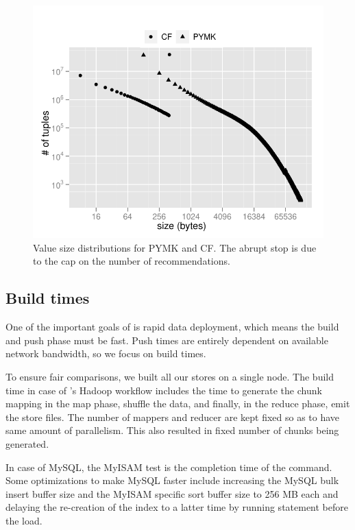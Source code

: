 \begin{figure}
  \centering
    \includegraphics[scale=0.55]{images/data_distribution.pdf}
  \caption{Value size distributions for PYMK and CF. The abrupt stop
is due to the cap on the number of recommendations.}
  \label{distribution}
\end{figure}

\subsection{Build times}

One of the important goals of \projectname{} is rapid data deployment,
which means the build and push phase must be fast. Push times are
entirely dependent on available network bandwidth, so we focus on
build times.
 
To ensure fair comparisons, we built all our stores on a single node.
The build time in case of \projectname's Hadoop workflow includes the
time to generate the chunk mapping in the map phase, shuffle the data,
and finally, in the reduce phase, emit the store files. The number of
mappers and reducer are kept fixed so as to have same amount of
parallelism. This also resulted in fixed number of chunks being
generated.

In case of MySQL, the MyISAM test is the completion time of the
 command. Some optimizations to make MySQL
faster include increasing the MySQL bulk insert buffer size and the
MyISAM specific sort buffer size to 256 MB each and delaying the
re-creation of the index to a latter time by running  statement before the load. 

